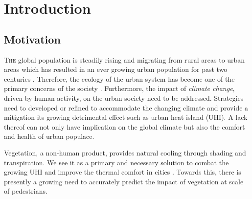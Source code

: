 \chapter{Introduction}
\label{ch:introduction}

\def\figdir{chapters/ch01_introduction/figures}


%		

\section{Motivation}

\lettrine[lines=3,nindent=0em,loversize=0.1]{T}{he} global population is steadily rising and migrating from rural areas to urban areas which has resulted in an ever growing urban population for past two centuries \citep{Oke2017a}. Therefore, the ecology of the urban system has become one of the primary concerns of the society \citep{pachauri2014climate}. Furthermore, the impact of \textit{climate change}, driven by human activity, on the urban society need to be addressed. Strategies need to developed or refined to accommodate the changing climate and provide a mitigation its growing detrimental effect such as urban heat island (UHI). A lack thereof can not only have implication on the global climate but also the comfort and health of urban populace. 

Vegetation, a non-human product, provides natural cooling through shading and transpiration. We see it as a primary and necessary solution to combat the growing UHI and improve the thermal comfort in cities \citep{Gillner2015, Bowler2010, Loughner2012}. Towards this, there is presently a growing need to accurately predict the impact of vegetation at scale of pedestrians. 

